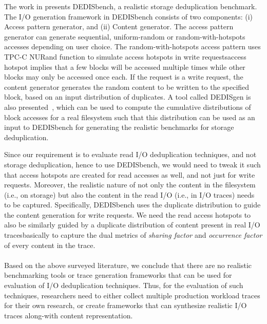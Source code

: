 The work in \cite{dedis} presents DEDISbench, a realistic storage
deduplication benchmark. 
The I/O generation framework in DEDISbench consists of two
components: (i) Access pattern generator, and (ii) Content generator.
The access pattern generator can generate sequential, uniform-random
or random-with-hotspots accesses depending on user choice.
The random-with-hotspots access pattern
uses TPC-C NURand function to simulate
access hotspots in write requests\textemdash{}access hotspot implies that
a few blocks will be accessed multiple times while other blocks may 
only be accessed once each. 
If the request is a write request, the
content generator generates the random content to be written to 
the specified block, based on an input distribution of 
duplicates.
A tool called DEDISgen is also
presented~\cite{dedis}, which can be used to compute the cumulative
distributions of block accesses for a real filesystem such that 
this distribution can be used as an input to DEDISbench for generating
the realistic benchmarks for storage deduplication.

Since our requirement is to evaluate read I/O deduplication techniques,
and not storage deduplication, hence to use DEDISbench, we would need
to tweak it such that access hotspots are created for read accesses
as well, and not just for write requests. 
Moreover, the realistic nature of not only the content in the 
filesystem (i.e., on storage) but also the content in the 
read I/O (i.e., in I/O traces)
needs to be captured. Specifically, DEDISbench uses the duplicate
distribution to guide the content generation for write requests.
We need the read access hotspots to also be similarly guided by
a duplicate distribution of content present in real I/O 
traces\textemdash{}basically
to capture the dual metrics of \textit{sharing factor} and 
\textit{occurrence factor} of every content in the trace.
\\
\\
Based on the above surveyed literature, we conclude that there are no
realistic benchmarking tools or trace generation frameworks that can
be used for evaluation of I/O deduplication techniques. Thus, for the 
evaluation of such techniques, researchers need to either collect multiple
production workload traces for their own research, or create frameworks
that can synthesize realistic I/O traces along-with content representation.
% 
